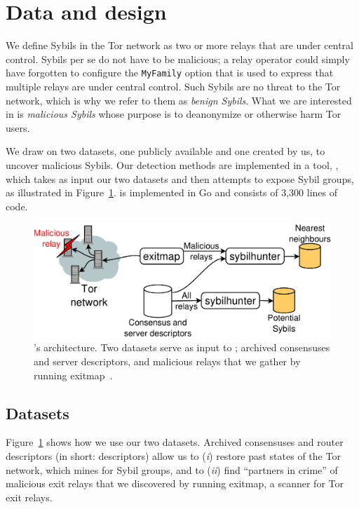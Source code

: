 \section{Data and design}
\label{sec:design}
We define Sybils in the Tor network as two or more relays that are under central
control.  Sybils per se do not have to be malicious; a relay operator could
simply have forgotten to configure the \texttt{MyFamily} option that is used to
express that multiple relays are under central control.  Such Sybils are no
threat to the Tor network, which is why we refer to them as \emph{benign
Sybils}.  What we are interested in is \emph{malicious Sybils} whose purpose is
to deanonymize or otherwise harm Tor users.

We draw on two datasets, one publicly available and one created by us, to
uncover malicious Sybils.  Our detection methods are implemented in a tool,
\sys, which takes as input our two datasets and then attempts to expose Sybil
groups, as illustrated in Figure~\ref{fig:system}.  \Sys is implemented in Go
and consists of 3,300 lines of code.

\begin{figure}[t]
	\centering
	\includegraphics[width=\linewidth]{diagrams/system_architecture.pdf}
	\caption{\Sys's architecture.  Two datasets serve as input to
		\sys; archived consensuses and server descriptors, and malicious
		relays that we gather by running exitmap~\cite{Winter2014a}.}
	\label{fig:system}
\end{figure}

\subsection{Datasets}
\label{sec:datasets}
Figure~\ref{fig:system} shows how we use our two datasets.  Archived consensuses
and router descriptors (in short: descriptors) allow us to (\emph{i}) restore
past states of the Tor network, which \sys mines for Sybil groups, and to
(\emph{ii}) find ``partners in crime'' of malicious exit relays that we
discovered by running exitmap, a scanner for Tor exit relays.

